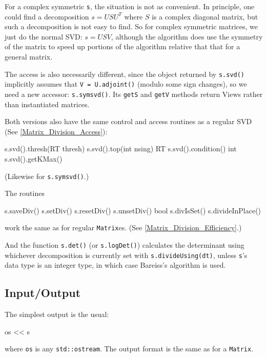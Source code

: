 \documentclass[twoside,letterpaper,11pt]{article}
\renewcommand{\tt}[1]{{\lstinline {#1}}}
\begin{document}
\begin{enumerate}
For a complex symmetric \tt{s}, the situation is not as convenient.
In principle, one could find a decomposition $s = USU^T$ where $S$ is 
a complex diagonal matrix, but such a decomposition is not easy to find. 
So for complex symmetric matrices, we
just do the normal SVD: $s = USV$, although the algorithm
does use the symmetry of the matrix to 
speed up portions of the algorithm relative that that for a general matrix.

The access is also necessarily different, since the object returned by 
\tt{s.svd()} implicitly assumes that \tt{V = U.adjoint()} (modulo some sign changes), 
so we need a 
new accessor: \tt{s.symsvd()}.  Its \tt{getS} and \tt{getV} methods return Views
rather than instantiated matrices.

Both versions also have the same control and access routines as a regular SVD
(See \ref{Matrix_Division_Access}):
\begin{tmvcode}
s.svd().thresh(RT thresh)
s.svd().top(int nsing)
RT s.svd().condition()
int s.svd().getKMax()
\end{tmvcode}
(Likewise for \tt{s.symsvd()}.)

\end{enumerate}
The routines 
\begin{tmvcode}
s.saveDiv()
s.setDiv()
s.resetDiv()
s.unsetDiv()
bool s.divIsSet()
s.divideInPlace()
\end{tmvcode}
work the same as for regular \tt{Matrix}es.
(See \ref{Matrix_Division_Efficiency}.)

And the function \tt{s.det()} (or \tt{s.logDet()}) calculates the determinant
using whichever decomposition is currently set with \tt{s.divideUsing(dt)},
unless \tt{s}'s data type is an integer type, in which case Bareiss's algorithm 
is used.

\subsection{Input/Output}
\label{SymMatrix_IO}

The simplest output is the usual:
\begin{tmvcode}
os << s
\end{tmvcode}
where \tt{os} is any \tt{std::ostream}.
The output format is the same as for a \tt{Matrix}.
\end{document}
